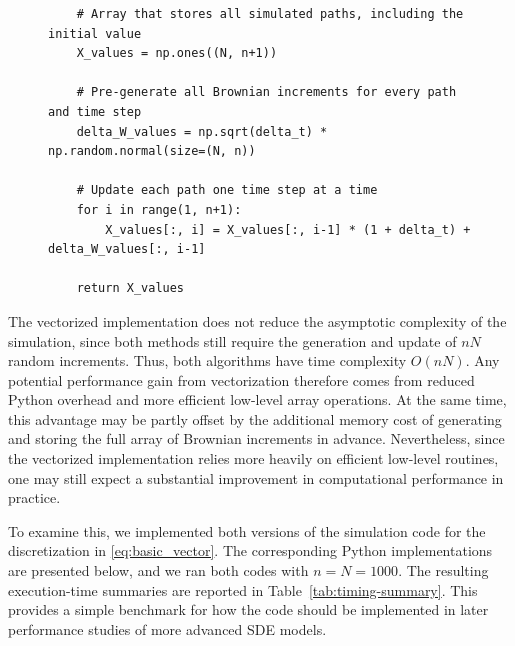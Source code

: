 \documentclass[11pt]{article}
\newcommand{\1}{\mathbbm{1}}
\theoremstyle{plain}
\theoremstyle{definition}
\theoremstyle{remark}
\begin{document}
\begin{figure}[t]
\begin{minipage}[t]{0.48\textwidth}
\begin{lstlisting}
    # Array that stores all simulated paths, including the initial value
    X_values = np.ones((N, n+1))
    
    # Pre-generate all Brownian increments for every path and time step
    delta_W_values = np.sqrt(delta_t) * np.random.normal(size=(N, n))
    
    # Update each path one time step at a time
    for i in range(1, n+1):
        X_values[:, i] = X_values[:, i-1] * (1 + delta_t) + delta_W_values[:, i-1]

    return X_values
\end{lstlisting}
\end{minipage}

\end{figure}

\FloatBarrier

The vectorized implementation does not reduce the asymptotic complexity of the simulation, since both methods still require the generation and update of $nN$ random increments. Thus, both algorithms have time complexity $O(nN)$. Any potential performance gain from vectorization therefore comes from reduced Python overhead and more efficient low-level array operations. At the same time, this advantage may be partly offset by the additional memory cost of generating and storing the full array of Brownian increments in advance. Nevertheless, since the vectorized implementation relies more heavily on efficient low-level routines, one may still expect a substantial improvement in computational performance in practice.

To examine this, we implemented both versions of the simulation code for the discretization in \eqref{eq:basic_vector}. The corresponding Python implementations are presented below, and we ran both codes with $n=N=1000$. The resulting execution-time summaries are reported in Table~\ref{tab:timing-summary}. This provides a simple benchmark for how the code should be implemented in later performance studies of more advanced SDE models.
\end{document}
